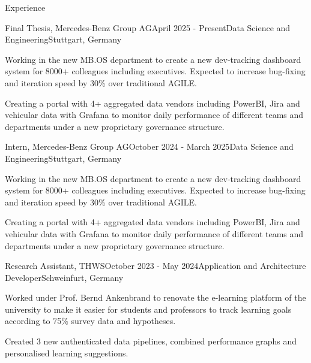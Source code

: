 \documentclass[
	a4paper, %
	10pt, %
]{resume} %
\begin{document}
\begin{rSection}{Experience}

	\begin{rSubsection}{Final Thesis, Mercedes-Benz Group AG}{April 2025 - Present}{Data Science and Engineering}{Stuttgart, Germany}
		\item Working in the new MB.OS department to create a new dev-tracking dashboard system for 8000+ colleagues including executives. Expected to increase bug-fixing and iteration speed by 30\% over traditional AGILE.
		\item Creating a portal with 4+ aggregated data vendors including PowerBI, Jira and vehicular data with Grafana to monitor daily performance of different teams and departments under a new proprietary governance structure.
	\end{rSubsection}


	\begin{rSubsection}{Intern, Mercedes-Benz Group AG}{October 2024 - March 2025}{Data Science and Engineering}{Stuttgart, Germany}
		\item Working in the new MB.OS department to create a new dev-tracking dashboard system for 8000+ colleagues including executives. Expected to increase bug-fixing and iteration speed by 30\% over traditional AGILE.
		\item Creating a portal with 4+ aggregated data vendors including PowerBI, Jira and vehicular data with Grafana to monitor daily performance of different teams and departments under a new proprietary governance structure.
	\end{rSubsection}


	\begin{rSubsection}{Research Assistant, THWS}{October 2023 - May 2024}{Application and Architecture Developer}{Schweinfurt, Germany}
		\item Worked under Prof. Bernd Ankenbrand to renovate the e-learning platform of the university to make it easier for students and professors to track learning goals according to 75\% survey data and hypotheses.
		\item Created 3 new authenticated data pipelines, combined performance graphs and personalised learning suggestions.
	\end{rSubsection}



\end{rSection}
\end{document}
